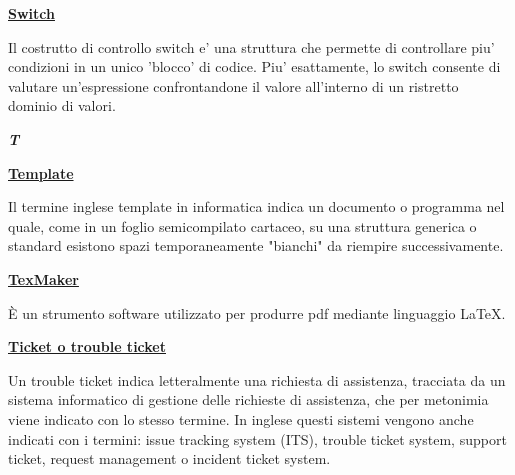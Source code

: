 \bigskip
\begin{addmargin}[0em]{0em}		
	\textbf{\underline{Switch}}
	\end{addmargin} 
	
\medskip
\begin{addmargin}[5em]{1em}	
Il costrutto di controllo switch e' una struttura che permette di controllare piu' condizioni in un unico 'blocco' di codice. Piu' esattamente, lo switch consente di valutare un'espressione confrontandone il valore all'interno di un ristretto dominio di valori.
\end{addmargin}	

\newpage
	
\cleardoublepage
{}
{}
\noindent\hrulefill\hspace{4mm}\textbf{\textsl{\Huge{T}}}\hspace{4mm}\hrulefill

\vspace*{2\bigskipamount}	

\begin{addmargin}[0em]{0em}		
	\textbf{\underline{Template}}
	\end{addmargin}
	 
\medskip
\begin{addmargin}[5em]{1em}	
Il termine inglese template in informatica indica un documento o programma nel quale, come in un foglio semicompilato cartaceo, su una struttura generica o standard esistono spazi temporaneamente "bianchi" da riempire successivamente.
\end{addmargin}

\bigskip
\begin{addmargin}[0em]{0em}		
	\textbf{\underline{TexMaker}}
\end{addmargin} 
	
\medskip
\begin{addmargin}[5em]{1em}	
È un strumento software utilizzato per produrre pdf mediante linguaggio \LaTeX{}.
\end{addmargin}

\bigskip
\begin{addmargin}[0em]{0em}		
	\textbf{\underline{Ticket o trouble ticket}}
\end{addmargin}
	
\medskip
\begin{addmargin}[5em]{1em}	 
Un trouble ticket indica letteralmente una richiesta di assistenza, tracciata da un sistema informatico di gestione delle richieste di assistenza, che per metonimia viene indicato con lo stesso termine.
In inglese questi sistemi vengono anche indicati con i termini: issue tracking system (ITS), trouble ticket system, support ticket, request management o incident ticket system.
\end{addmargin}

